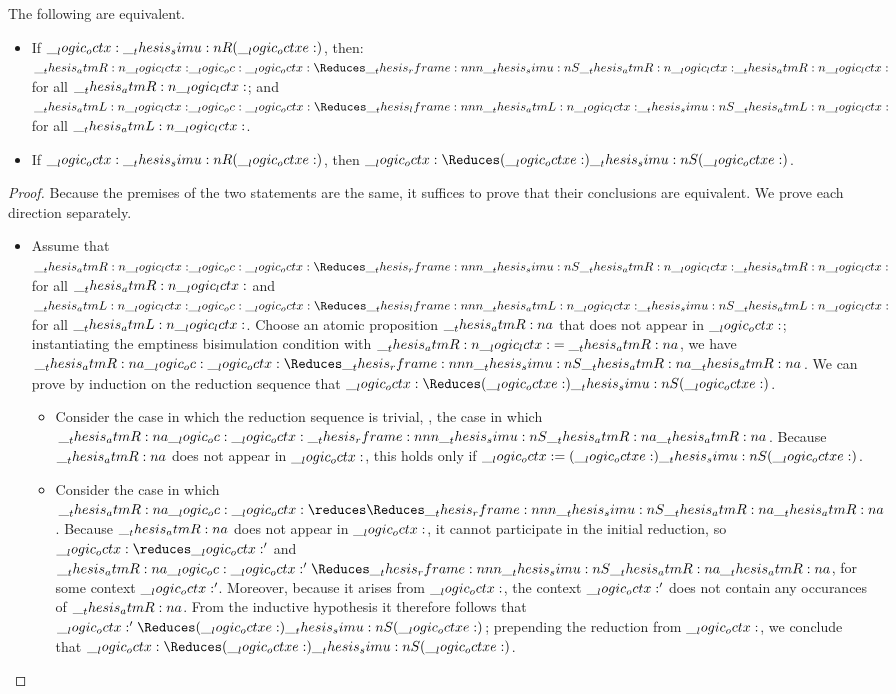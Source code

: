 \begin{theorem}
  The following are equivalent.
  \begin{itemize}
  \item
    If $\__logic_octx: \__thesis_simu:n {R} (\__logic_octxe:)$, then: $\atmR{\lctx} \oc \octx \Reduces\rframe{\simu{S}}{\atmR{\lctx}} \atmR{\lctx}$ for all $\__thesis_atmR:n {\__logic_lctx:}$; and $\atmL{\lctx} \oc \octx \Reduces\lframe{\atmL{\lctx}}{\simu{S}} \atmL{\lctx}$ for all $\__thesis_atmL:n {\__logic_lctx:}$.
  \item
    If $\__logic_octx: \__thesis_simu:n {R} (\__logic_octxe:)$, then $\octx \Reduces (\octxe) \simu{S} (\octxe)$.
  \end{itemize}
\end{theorem}
\begin{proof}
  Because the premises of the two statements are the same, it suffices to prove that their conclusions are equivalent.
  We prove each direction separately.
  \begin{itemize}
  \item 
  Assume that $\atmR{\lctx} \oc \octx \Reduces\rframe{\simu{S}}{\atmR{\lctx}} \atmR{\lctx}$ for all $\__thesis_atmR:n {\__logic_lctx:}$ and $\atmL{\lctx} \oc \octx \Reduces\lframe{\atmL{\lctx}}{\simu{S}} \atmL{\lctx}$ for all $\__thesis_atmL:n {\__logic_lctx:}$.
  Choose an atomic proposition $\__thesis_atmR:n {a}$ that does not appear in $\__logic_octx:$; instantiating the emptiness bisimulation condition with $\__thesis_atmR:n {\__logic_lctx:} = \__thesis_atmR:n {a}$, we have $\atmR{a} \oc \octx \Reduces\rframe{\simu{S}}{\atmR{a}} \atmR{a}$.
  We can prove by induction on the reduction sequence that $\octx \Reduces (\octxe) \simu{S} (\octxe)$.
  \begin{itemize}
  \item
    Consider the case in which the reduction sequence is trivial, \ie, the case in which $\atmR{a} \oc \octx \rframe{\simu{S}}{\atmR{a}} \atmR{a}$.
    Because $\__thesis_atmR:n {a}$ does not appear in $\__logic_octx:$, this holds only if $\__logic_octx: = (\__logic_octxe:) \__thesis_simu:n {S} (\__logic_octxe:)$.

  \item
    Consider the case in which $\atmR{a} \oc \octx \reduces\Reduces\rframe{\simu{S}}{\atmR{a}} \atmR{a}$.
    Because $\__thesis_atmR:n {a}$ does not appear in $\__logic_octx:$, it cannot participate in the initial reduction, so $\octx \reduces \octx'$ and $\atmR{a} \oc \octx' \Reduces\rframe{\simu{S}}{\atmR{a}} \atmR{a}$, for some context $\__logic_octx:'$.
    Moreover, because it arises from $\__logic_octx:$, the context $\__logic_octx:'$ does not contain any occurances of $\__thesis_atmR:n {a}$.
    From the inductive hypothesis it therefore follows that $\octx' \Reduces (\octxe) \simu{S} (\octxe)$;
    prepending the reduction from $\__logic_octx:$, we conclude that $\octx \Reduces (\octxe) \simu{S} (\octxe)$.
  \end{itemize}


\end{itemize}
\end{proof}
